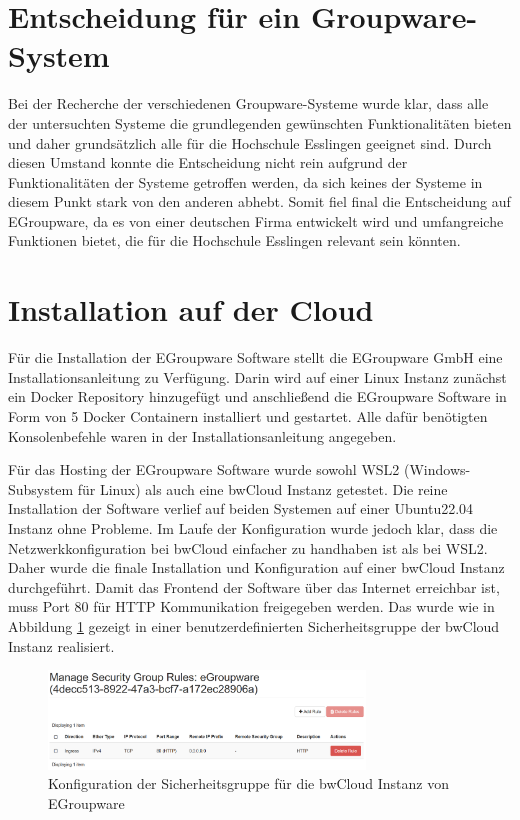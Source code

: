 \section{Entscheidung für ein Groupware-System}

Bei der Recherche der verschiedenen Groupware-Systeme wurde klar, dass alle der untersuchten Systeme die grundlegenden gewünschten Funktionalitäten bieten und daher grundsätzlich alle für die Hochschule Esslingen geeignet sind.
Durch diesen Umstand konnte die Entscheidung nicht rein aufgrund der Funktionalitäten der Systeme getroffen werden, da sich keines der Systeme in diesem Punkt stark von den anderen abhebt.
Somit fiel final die Entscheidung auf EGroupware, da es von einer deutschen Firma entwickelt wird und umfangreiche Funktionen bietet, die für die Hochschule Esslingen relevant sein könnten.




\section{Installation auf der Cloud}

Für die Installation der EGroupware Software stellt die EGroupware GmbH eine Installationsanleitung zu Verfügung.
Darin wird auf einer Linux Instanz zunächst ein Docker Repository hinzugefügt und anschließend die EGroupware Software in Form von 5 Docker Containern installiert und gestartet.
Alle dafür benötigten Konsolenbefehle waren in der Installationsanleitung angegeben. \autocite{egroupware-installation}

Für das Hosting der EGroupware Software wurde sowohl WSL2 (Windows-Subsystem für Linux) als auch eine bwCloud Instanz getestet.
Die reine Installation der Software verlief auf beiden Systemen auf einer Ubuntu22.04 Instanz ohne Probleme.
Im Laufe der Konfiguration wurde jedoch klar, dass die Netzwerkkonfiguration bei bwCloud einfacher zu handhaben ist als bei WSL2.
Daher wurde die finale Installation und Konfiguration auf einer bwCloud Instanz durchgeführt.
Damit das Frontend der Software über das Internet erreichbar ist, muss Port 80 für HTTP Kommunikation freigegeben werden.
Das wurde wie in Abbildung \ref{fig:bwcloud_security_group} gezeigt in einer benutzerdefinierten Sicherheitsgruppe der bwCloud Instanz realisiert.
\begin{figure}[H]
    \centering
    \includegraphics[width=0.75\textwidth]{images/bwCloud_SecurityGroup.png}
    \caption{Konfiguration der Sicherheitsgruppe für die bwCloud Instanz von EGroupware}
    \label{fig:bwcloud_security_group}
\end{figure}

